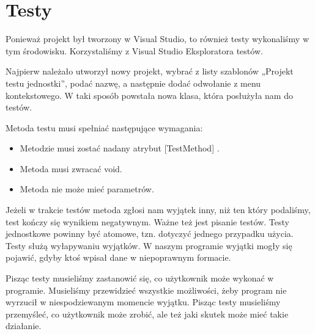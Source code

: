 \documentclass{article}
\begin{document}
	\section{Testy}

	Ponieważ projekt był tworzony w Visual Studio, to również testy wykonaliśmy w tym środowisku. Korzystaliśmy z Visual Studio Eksploratora testów.
	
	Najpierw należało utworzył nowy projekt, wybrać z listy szablonów „Projekt testu jednostki”, podać nazwę, a następnie dodać odwołanie z menu kontekstowego. W taki sposób powstała nowa klasa, która posłużyła nam do testów.
	
	Metoda testu musi spełniać następujące wymagania:
	\begin{itemize}
	\item 	Metodzie musi zostać nadany atrybut [TestMethod] .
	\item 	Metoda musi zwracać void.
	\item	Metoda nie może mieć parametrów.
	\end{itemize}
	
	Jeżeli w trakcie testów metoda zgłosi nam wyjątek inny, niż ten który podaliśmy, test kończy się wynikiem negatywnym.
	Ważne też jest pisanie testów. Testy jednostkowe powinny być atomowe, tzn. dotyczyć jednego przypadku użycia.
	Testy służą wyłapywaniu wyjątków. W naszym programie wyjątki mogły się pojawić, gdyby ktoś wpisał dane w niepoprawnym formacie.
	
	Pisząc testy musieliśmy zastanowić się, co użytkownik może wykonać w programie. Musieliśmy przewidzieć wszystkie możliwości, żeby program nie wyrzucił w niespodziewanym momencie wyjątku. Pisząc testy musieliśmy przemyśleć, co użytkownik może zrobić, ale też jaki skutek może mieć takie działanie.
	
\end{document}
